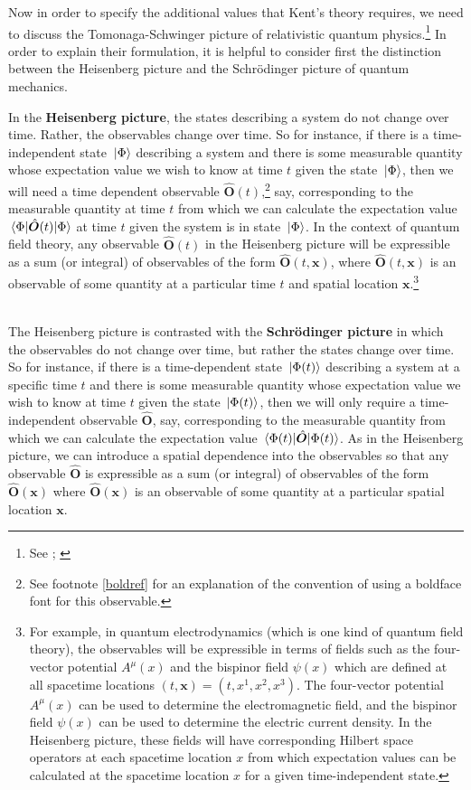 Now in order to specify the additional values that Kent's theory requires, we need to discuss the Tomonaga-Schwinger picture of relativistic quantum physics.\footnote{See \cite{SchwingerJulianI}; \cite{TomonagaI}} In order to explain their formulation, it is helpful to consider first the distinction between the Heisenberg picture and the Schr\"{o}dinger picture of quantum mechanics. 

In the \textbf{Heisenberg picture}, the states describing a system do not change over time. Rather, the observables change over time. So for instance, if there is a time-independent state $\ket*{\Phi}$ describing a system and there is some measurable quantity whose expectation value we wish to know at time $t$ given the state $\ket*{\Phi}$, then we will need a time dependent observable $\hat{\bm{O}}(t)$,\footnote{See footnote \ref{boldref} for an explanation of the convention of using a boldface font for this observable.} say, corresponding to the measurable quantity at time $t$ from which we can calculate the expectation value $\ev*{\hat{\bm{O}}(t)}{\Phi}$ at time $t$  given the system is in state $\ket*{\Phi}$. In the context of quantum field theory, any observable $\hat{\bm{O}}(t)$ in the Heisenberg picture will be expressible as a sum (or integral) of observables of the form $\hat{\bm{O}}(t, \bm{x})$, where $\hat{\bm{O}}(t, \bm{x})$ is an observable of some quantity at a particular time $t$ and spatial location $\bm{x}$.\footnote{For example, in quantum electrodynamics (which is one kind of quantum field theory), the observables will be expressible in terms of fields such as the four-vector potential $A^\mu(x)$ and the bispinor field $\psi(x)$ which are defined at all spacetime locations $(t, \bm{x})=(t, x^1, x^2, x^3)$. The four-vector potential $A^\mu(x)$ can be used to determine the electromagnetic field, and the bispinor field $\psi(x)$ can be used to determine the electric current density. In the Heisenberg picture, these fields will have corresponding Hilbert space operators at each spacetime location $x$ from which expectation values can be calculated at the spacetime location $x$ for a given time-independent state.}
\strut \\[\baselineskip]
The Heisenberg picture is contrasted with the \textbf{Schr\"{o}dinger picture} in which the observables do not change over time, but rather the states change over time. So for instance, if there is a time-dependent state $\ket*{\Phi(t)}$ describing a system at a specific time $t$ and there is some measurable quantity whose expectation value we wish to know at time $t$ given the state $\ket*{\Phi(t)}$, then we will only require a time-independent observable $\hat{\bm{O}}$, say, corresponding to the measurable quantity from which we can calculate the expectation value $\ev*{\hat{\bm{O}}}{\Phi(t)}$. As in the Heisenberg picture, we can introduce a spatial dependence into the observables so that any observable  $\hat{\bm{O}}$ is expressible as a sum (or integral) of observables of the form $\hat{\bm{O}}(\bm{x})$ where $\hat{\bm{O}}(\bm{x})$ is an observable of some quantity at a particular spatial location $\bm{x}$.
